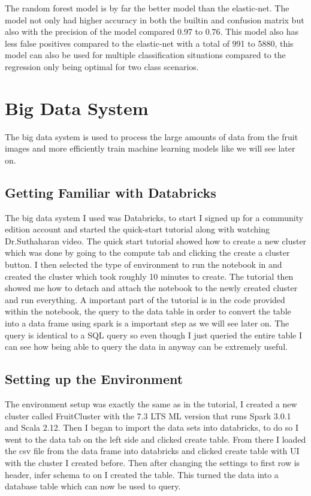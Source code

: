 \documentclass[conference]{IEEEtran}
\begin{document}
The random forest model is by far the better model than the elastic-net. The model not only had higher accuracy in both the builtin and confusion matrix but also with the precision of the model compared 0.97 to 0.76. This model also has less false positives compared to the elastic-net with a total of 991 to 5880, this model can also be used for multiple classification situations compared to the regression only being optimal for two class scenarios.

\section{Big Data System}
The big data system is used to process the large amounts of data from the fruit images and more efficiently train machine learning models like we will see later on.

\subsection{Getting Familiar with Databricks}
The big data system I used was Databricks, to start I signed up for a community edition account and started the quick-start tutorial along with watching Dr.Suthaharan video. The quick start tutorial showed how to create a new cluster which was done by going to the compute tab and clicking the create a cluster button. I then selected the type of environment to run the notebook in and created the cluster which took roughly 10 minutes to create. The tutorial then showed me how to detach and attach the notebook to the newly created cluster and run everything. A important part of the tutorial is in the code provided within the notebook, the query to the data table in order to convert the table into a data frame using spark is a important step as we will see later on. The query is identical to a SQL query so even though I just queried the entire table I can see how being able to query the data in anyway can be extremely useful.

\subsection{Setting up the Environment}
The environment setup was exactly the same as in the tutorial, I created a new cluster called FruitCluster with the 7.3 LTS ML version that runs Spark 3.0.1 and Scala 2.12. Then I began to import the data sets into databricks, to do so I went to the data tab on the left side and clicked create table. From there I loaded the csv file from the data frame into databricks and clicked create table with UI with the cluster I created before. Then after changing the settings to first row is header, infer schema to on I created the table. This turned the data into a database table which can now be used to query.
\end{document}

